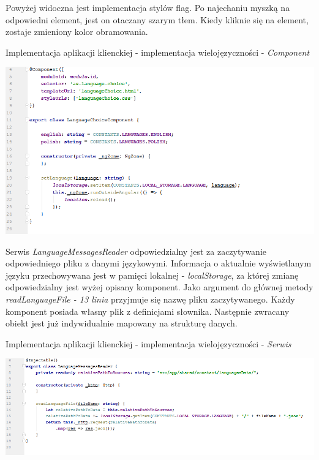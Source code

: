 \documentclass[10pt,titlepage]{article} %
\begin{document}
Powyżej widoczna jest implementacja stylów flag. Po najechaniu myszką na odpowiedni element, jest on otaczany szarym tłem. Kiedy kliknie się na element, zostaje zmieniony kolor obramowania.

\begin{listing}[H]
\caption[Implementacja aplikacji klienckiej - implementacja wielojęzyczności - \textit{Component}]{Implementacja aplikacji klienckiej - implementacja wielojęzyczności - \textit{Component}}
\includegraphics[width=1.0\textwidth, height=0.45\textheight]{img/sekcja3/frontend/wielojezycznoscComponent}
\end{listing}

Serwis \textit{LanguageMessagesReader} odpowiedzialny jest za zaczytywanie odpowiedniego pliku z danymi językowymi. Informacja o aktualnie wyświetlanym języku przechowywana jest w pamięci lokalnej - \textit{localStorage}, za której zmianę odpowiedzialny jest wyżej opisany komponent. Jako argument do głównej metody \textit{readLanguageFile - 13 linia} przyjmuje się nazwę pliku zaczytywanego. Każdy komponent posiada własny plik z definicjami słownika. Następnie zwracany obiekt jest już indywidualnie mapowany na strukturę danych.

\begin{listing}[H]
\caption[Implementacja aplikacji klienckiej - implementacja wielojęzyczności - \textit{Serwis}]{Implementacja aplikacji klienckiej - implementacja wielojęzyczności - \textit{Serwis}}
\includegraphics[width=1.0\textwidth, height=0.35\textheight]{img/sekcja3/frontend/wielojezycznoscSerwis}
\end{listing}
\end{document}
